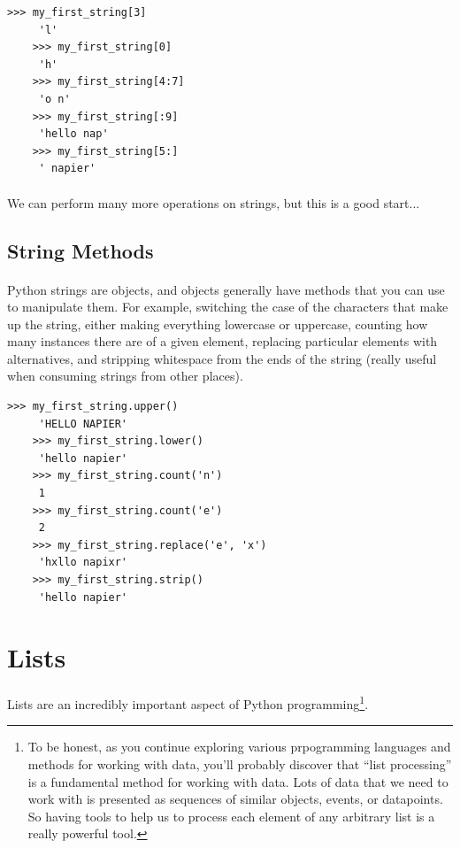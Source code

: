 \documentclass[12pt, a4paper, oneside]{book}
\begin{document}
\begin{lstlisting}[style=DOS]
    >>> my_first_string[3]
     'l'
    >>> my_first_string[0]
     'h'
    >>> my_first_string[4:7]
     'o n'
    >>> my_first_string[:9]
     'hello nap'
    >>> my_first_string[5:]
     ' napier'
\end{lstlisting}

\paragraph{} We can perform many more operations on strings, but this is a good start...

\subsection{String Methods}
\paragraph{} Python strings are objects, and objects generally have methods that you can use to manipulate them. For example, switching the case of the characters that make up the string, either making everything lowercase or uppercase, counting how many instances there are of a given element, replacing particular elements with alternatives, and stripping whitespace from the ends of the string (really useful when consuming strings from other places).

\begin{lstlisting}[style=DOS]
    >>> my_first_string.upper()
     'HELLO NAPIER'
    >>> my_first_string.lower()
     'hello napier'
    >>> my_first_string.count('n')
     1
    >>> my_first_string.count('e')
     2
    >>> my_first_string.replace('e', 'x')
     'hxllo napixr'
    >>> my_first_string.strip()
     'hello napier'
\end{lstlisting}


\section{Lists}
\paragraph{} Lists are an incredibly important aspect of Python programming\footnote{To be honest, as you continue exploring various prpogramming languages and methods for working with data, you'll probably discover that ``list processing'' is a fundamental method for working with data. Lots of data that we need to work with is presented as sequences of similar objects, events, or datapoints. So having tools to help us to process each element of any arbitrary list is a really powerful tool.}.
\end{document}

